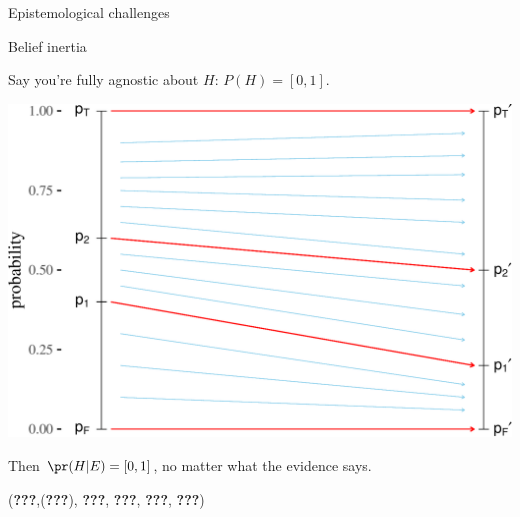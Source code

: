 \documentclass[10pt,ignorenonframetext,x11names, dvipsnames, bibspacing,natbib]{beamer}
\begin{document}
\begin{frame}{Epistemological challenges}

\begin{block}{Belief inertia}

Say you're fully agnostic about \(H\): \(P(H) = [0,1]\).

\begin{center}

\begin{center}\includegraphics[width=0.7\linewidth]{presentationESSLLI_files/figure-beamer/unnamed-chunk-4-1} \end{center}
\end{center}

Then \(\pr(H \vert E) =[0,1]\), no matter what the evidence says.

\vspace{1mm} \scriptsize

({\textbf{???}},({\textbf{???}}), {\textbf{???}}, {\textbf{???}},
{\textbf{???}}, {\textbf{???}})

\end{block}

\end{frame}
\end{document}
